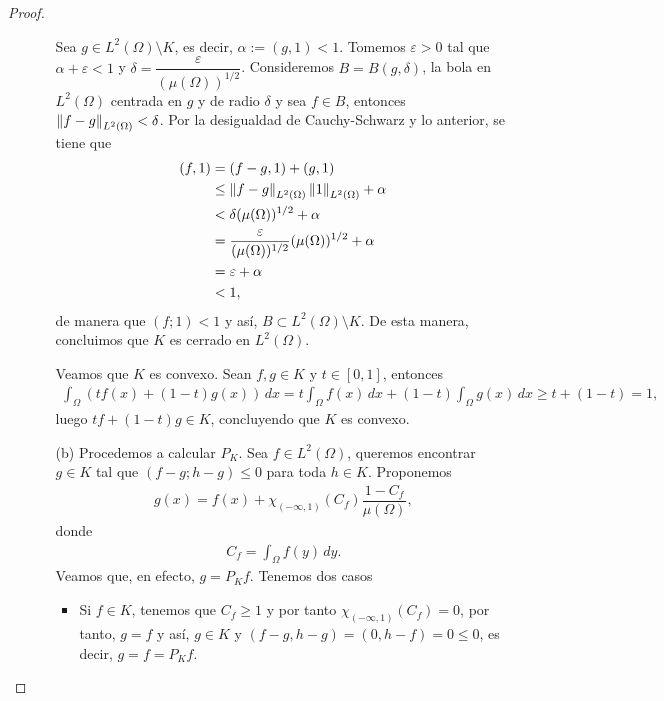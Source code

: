 \begin{proof}
\begin{enumerate}
\begin{enumerate}
        Sea $g\in L^2(\Omega)\setminus K$, es decir, $\alpha:=(g,1)<1$. Tomemos $\varepsilon>0$ tal que $\alpha+\varepsilon<1$ y  $\delta=\dfrac{\varepsilon}{(\mu(\Omega))^{1/2}}$. Consideremos $B=B(g,\delta)$, la bola en $L^2(\Omega)$ centrada en $g$ y de radio $\delta$ y sea $f \in B$, entonces $\left\|f-g\right\|_{L^2(\Omega)}<\delta$. Por la desigualdad de Cauchy-Schwarz y lo anterior, se tiene que 
        \begin{align*}
            (f,1)&=(f-g,1)+(g,1)\\
            &\leq \left\|f-g\right\|_{L^2(\Omega)}\left\|1\right\|_{L^2(\Omega)}+\alpha\\
            &<\delta (\mu(\Omega))^{1/2}+\alpha\\
            &=\dfrac{\varepsilon}{(\mu(\Omega))^{1/2}}(\mu(\Omega))^{1/2}+\alpha\\
            &=\varepsilon+\alpha\\
            &<1,
        \end{align*}
        de manera que $(f;1)<1$ y así, $B\subset L^2(\Omega)\setminus K$. De esta manera, concluimos que $K$ es cerrado en $L^2(\Omega)$.

        Veamos que $K$ es convexo. Sean $f,g \in K$ y $t \in [0,1]$, entonces
        \begin{align*}
            \int_{\Omega}(tf(x)+(1-t)g(x))\, dx=t\int_{\Omega}f(x)\, dx+(1-t)\int_{\Omega}g(x)\, dx\geq t+(1-t)=1,
        \end{align*}
        luego $tf+(1-t)g \in K$, concluyendo que $K$ es convexo. 

        \item[(b)] Procedemos a calcular $P_K$. Sea $f \in L^2(\Omega)$, queremos encontrar $g\in K$ tal que $(f-g;h-g)\leq 0$ para toda $h \in K$. Proponemos 
        \begin{align*}
            g(x)=f(x)+\chi_{(-\infty,1)}(C_f)\dfrac{1-C_f}{\mu(\Omega)},
        \end{align*}
        donde 
        \begin{align*}
            C_f=\int_\Omega f(y)\, dy.
        \end{align*}
        Veamos que, en efecto, $g=P_K f$. Tenemos dos casos
        \begin{itemize}
            \item Si $f \in K$, tenemos que $C_f\geq 1$ y por tanto $\chi_{(-\infty,1)}(C_f)=0$, por tanto, $g=f$ y así, $g \in K$ y $(f-g,h-g)=(0,h-f)=0\leq 0$, es decir, $g=f=P_Kf$.


\end{itemize}
\end{enumerate}
\end{enumerate}
\end{proof}
